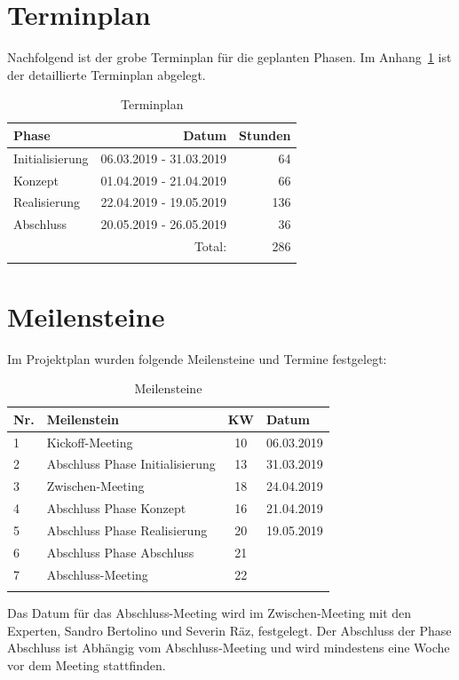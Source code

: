 
\clearpage
\section{Terminplan}\label{terminplan}

Nachfolgend ist der grobe Terminplan für die geplanten Phasen. Im Anhang~\ref{terminplan} ist
der detaillierte Terminplan abgelegt.

\begin{longtable}[]{@{}lrr@{}}
  \toprule
  Phase           & Datum                   & Stunden\tabularnewline
  \midrule
  \endhead
  Initialisierung & 06.03.2019 - 31.03.2019 & 64\tabularnewline
  Konzept         & 01.04.2019 - 21.04.2019 & 66\tabularnewline
  Realisierung    & 22.04.2019 - 19.05.2019 & 136\tabularnewline
  Abschluss       & 20.05.2019 - 26.05.2019 & 36\tabularnewline
  \midrule
                  & Total:                  & 286\tabularnewline
  \bottomrule
  \caption{Terminplan}
\end{longtable}


\section{Meilensteine}\label{meilensteine}

Im Projektplan wurden folgende Meilensteine und Termine festgelegt:

\begin{longtable}[]{@{}llcl@{}}
  \toprule
  Nr. & Meilenstein                     & KW & Datum\tabularnewline
  \midrule
  \endhead
  1   & Kickoff-Meeting                 & 10 & 06.03.2019\tabularnewline
  2   & Abschluss Phase Initialisierung & 13 & 31.03.2019\tabularnewline
  3   & Zwischen-Meeting                & 18 & 24.04.2019\tabularnewline
  4   & Abschluss Phase Konzept         & 16 & 21.04.2019\tabularnewline
  5   & Abschluss Phase Realisierung    & 20 & 19.05.2019\tabularnewline
  6   & Abschluss Phase Abschluss       & 21 & \tabularnewline
  7   & Abschluss-Meeting               & 22 & \tabularnewline
  \bottomrule
  \caption{Meilensteine}
\end{longtable}

Das Datum für das Abschluss-Meeting wird im Zwischen-Meeting mit den Experten, Sandro Bertolino und Severin Räz, festgelegt. Der Abschluss der Phase Abschluss ist Abhängig vom Abschluss-Meeting und wird mindestens eine Woche vor dem Meeting stattfinden.

